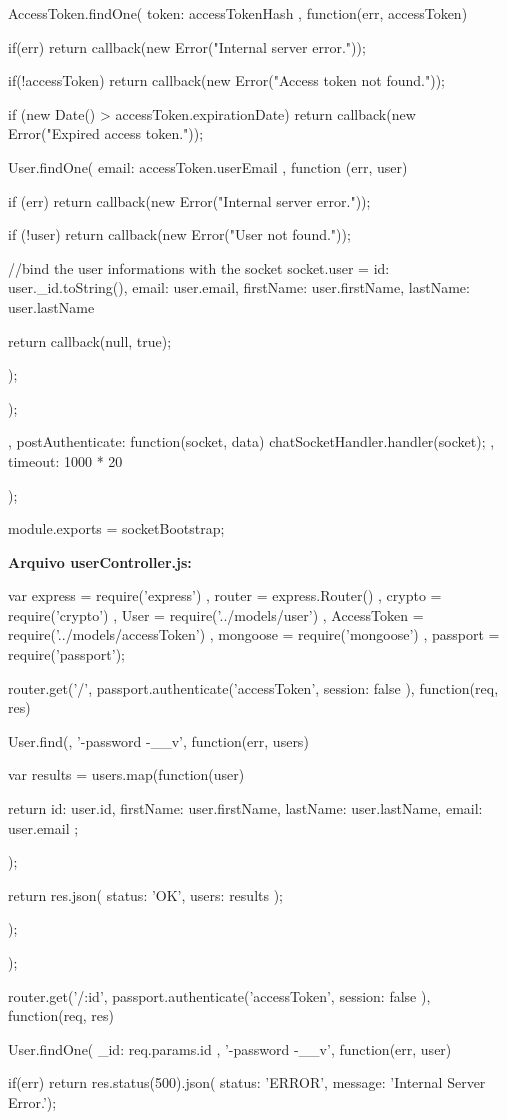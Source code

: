 \begin{flushleft}
{{{			AccessToken.findOne({ token: accessTokenHash }, function(err, accessToken) {
				if(err)
				return callback(new Error("Internal server error."));
				
				if(!accessToken)
				return callback(new Error("Access token not found."));
				
				
				if (new Date() > accessToken.expirationDate)
				return callback(new Error("Expired access token."));
				
				User.findOne({ email: accessToken.userEmail }, function (err, user) {
					if (err)
					return callback(new Error("Internal server error."));
					
					if (!user)
					return callback(new Error("User not found."));
					
					//bind the user informations with the socket
					socket.user = {
						id: user.\_id.toString(),
						email: user.email,
						firstName: user.firstName,
						lastName: user.lastName
					}
					
					return callback(null, true);
				});
			});
			
		},
		postAuthenticate: function(socket, data) {
			chatSocketHandler.handler(socket);
		},
		timeout: 1000 * 20
	});
}

module.exports = socketBootstrap;


\textbf{Arquivo userController.js:}

var express = require('express')
, router = express.Router()
, crypto = require('crypto')
, User = require('../models/user')
, AccessToken = require('../models/accessToken')
, mongoose = require('mongoose')
, passport = require('passport');

router.get('/', passport.authenticate('accessToken', { session: false }), function(req, res) {
	User.find({}, '-password -\_\_v', function(err, users) {
		
		var results = users.map(function(user) {
			return {
				id: user.id,
				firstName: user.firstName,
				lastName: user.lastName,
				email: user.email
			};
			
		});
		
		return res.json({
			status: 'OK',
			users: results
		});
	});
	
});

router.get('/:id', passport.authenticate('accessToken', { session: false }), function(req, res) {
	User.findOne({ \_id: req.params.id }, '-password -\_\_v', function(err, user) {
		if(err)
		return res.status(500).json({ status: 'ERROR', message: 'Internal Server Error.'});
		
}}
\end{flushleft}
